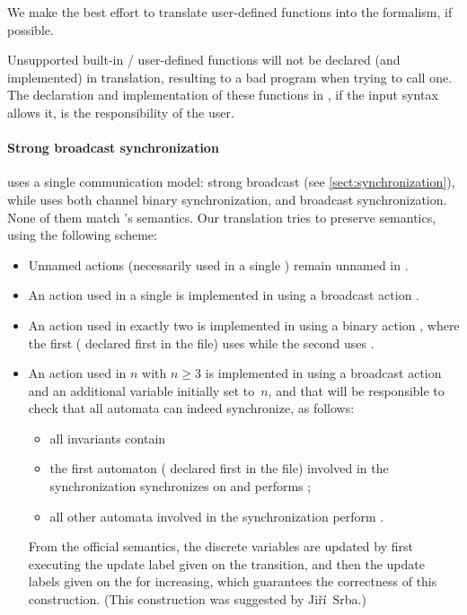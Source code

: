We make the best effort to translate user-defined functions into the \uppaal{} formalism, if possible.

\begin{becareful}
	Unsupported \imitator{} built-in / user-defined functions will not be declared (and implemented) in \uppaal{} translation, resulting to a bad program when trying to call one. The declaration and implementation of these functions in \uppaal{}, if the \uppaal{} input syntax allows it, is the responsibility of the user.
\end{becareful}

\paragraph{Strong broadcast synchronization}
\imitator{} uses a single communication model: strong broadcast (see \cref{sect:synchronization}), while \uppaal{} uses both channel binary synchronization, and broadcast synchronization.
None of them match \imitator{}'s semantics.
Our translation tries to preserve \imitator{} semantics, using the following scheme:
\begin{itemize}
	\item Unnamed actions (necessarily used in a single \IPTA{}) remain unnamed in \uppaal{}.
	\item An action  used in a single \IPTA{} is implemented in \uppaal{} using a broadcast action .
	\item An action  used in exactly two \IPTA{} is implemented in \uppaal{} using a binary action , where the first (\ie{} declared first in the \imitator{} file) uses  while the second uses .
	\item An action  used in $n$ \IPTA{} with $n \geq 3$ is implemented in \uppaal{} using a broadcast action  and an additional variable  initially set to~$n$, and that will be responsible to check that all automata can indeed synchronize, as follows:
	      \begin{itemize}
		      \item all invariants contain 
		      \item the first automaton (\ie{} declared first in the \imitator{} file) involved in the synchronization synchronizes on  and performs ;
		      \item all other automata involved in the synchronization perform .
	      \end{itemize}
	      From the \uppaal{} official semantics, the discrete variables are updated by first executing the update label given on the  transition, and then the update labels given on the  for increasing, which guarantees the correctness of this construction.
	      (This construction was suggested by Jiří~Srba.)
\end{itemize}
